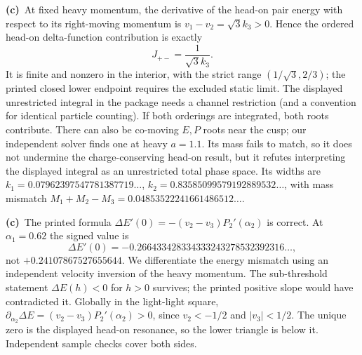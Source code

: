 \documentclass[11pt,a4paper]{article}
\newcommand{\Lc}{\textbf{(c)}\ }
\begin{document}
\Lc At fixed heavy momentum, the derivative of the head-on pair energy with
respect to its right-moving momentum is $v_1-v_2=\sqrt3 k_3>0$. Hence the
ordered head-on delta-function contribution is exactly
\begin{equation}
 J_{+-}=\frac1{\sqrt3 k_3}.
\end{equation}
It is finite and nonzero in the interior, with the strict range
$(1/\sqrt3,2/3)$; the printed closed lower endpoint requires the excluded
static limit. The displayed unrestricted integral
in the package needs a channel restriction (and a convention for identical
particle counting). If both orderings are integrated, both roots contribute.
There can also be co-moving $E,P$ roots near the cusp; our independent solver
finds one at heavy $a=1.1$. Its mass fails to match, so it does not undermine
the charge-conserving head-on result, but it refutes interpreting the displayed
integral as an unrestricted total phase space. Its widths are
$k_1=0.07962397547781387719\ldots$,
$k_2=0.83585099579192889532\ldots$, with mass mismatch
$M_1+M_2-M_3=0.04853522241661486512\ldots$.

\Lc The printed formula
$\Delta E'(0)=-(v_2-v_3)P_2'(\alpha_2)$ is correct. At $\alpha_1=0.62$ the
signed value is
\begin{equation}
 \Delta E'(0)=-0.266433428334333243278532392316\ldots,
\end{equation}
not $+0.24107867527655644$. We differentiate the energy mismatch using an
independent velocity inversion of the heavy momentum. The sub-threshold
statement $\Delta E(h)<0$ for $h>0$ survives; the printed positive
slope would have contradicted it. Globally in the light-light square,
$\partial_{\alpha_2}\Delta E=(v_2-v_3)P_2'(\alpha_2)>0$, since
$v_2<-1/2$ and $|v_3|<1/2$. The unique zero is the displayed head-on
resonance, so the lower triangle is below it. Independent sample checks
cover both sides.
\end{document}
